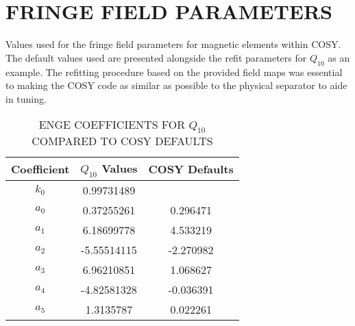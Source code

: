 
\chapter{FRINGE FIELD PARAMETERS}

Values used for the fringe field parameters for magnetic elements within COSY. The default values used are presented alongside the refit parameters for $Q_{10}$ as an example. The refitting procedure based on the provided field maps was essential to making the COSY code as similar as possible to the physical separator to aide in tuning.

\begin{table}[h]
    \begin{center}
        \caption{ENGE COEFFICIENTS FOR $Q_{10}$ COMPARED TO COSY DEFAULTS}
        \begin{tabular}{c S[table-format=2.8]S[table-format=2.6]}
            \toprule
            \midrule
            \textbf{Coefficient} & \textbf{$Q_{10}$ Values} &
                \textbf{COSY Defaults} \\
            \midrule
            $k_0$ &  0.99731489 & \\
            $a_0$ &  0.37255261 &  0.296471 \\
            $a_1$ &  6.18699778 &  4.533219 \\
            $a_2$ & -5.55514115 & -2.270982 \\
            $a_3$ &  6.96210851 &  1.068627 \\
            $a_4$ & -4.82581328 & -0.036391 \\
            $a_5$ &  1.3135787 &  0.022261 \\
            \bottomrule
        \end{tabular}
        \label{tab:enge}
    \end{center}
\end{table}